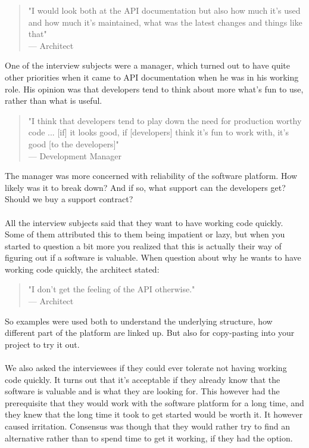 \documentclass{cslthse-msc}
\begin{document}
    \begin{quote}
        "I would look both at the API documentation but also how much it's used and how much it's maintained, what was the latest changes and things like that" \\
        --- Architect
    \end{quote}
    One of the interview subjects were a manager, which turned out to have quite other priorities when it came to API documentation when he was in his working role. His opinion was that developers tend to think about more what's fun to use, rather than what is useful.
    \begin{quote}
        "I think that developers tend to play down the need for production worthy code ... [if] it looks good, if [developers] think it's fun to work with, it's good [to the developers]" \\
        --- Development Manager
    \end{quote}
    The manager was more concerned with reliability of the software platform. How likely was it to break down? And if so, what support can the developers get? Should we buy a support contract?
    \\ \\
    All the interview subjects said that they want to have working code quickly. Some of them attributed this to them being impatient or lazy, but when you started to question a bit more you realized that this is actually their way of figuring out if a software is valuable. When question about why he wants to have working code quickly, the architect stated:
    \begin{quote}
        "I don't get the feeling of the API otherwise." \\
        --- Architect
    \end{quote}
    So examples were used both to understand the underlying structure, how different part of the platform are linked up. But also for copy-pasting into your project to try it out.
    \\ \\
    We also asked the interviewees if they could ever tolerate not having working code quickly. It turns out that it's acceptable if they already know that the software is valuable and is what they are looking for. This however had the prerequisite that they would work with the software platform for a long time, and they knew that the long time it took to get started would be worth it. It however caused irritation. Consensus was though that they would rather try to find an alternative rather than to spend time to get it working, if they had the option.
\end{document}
